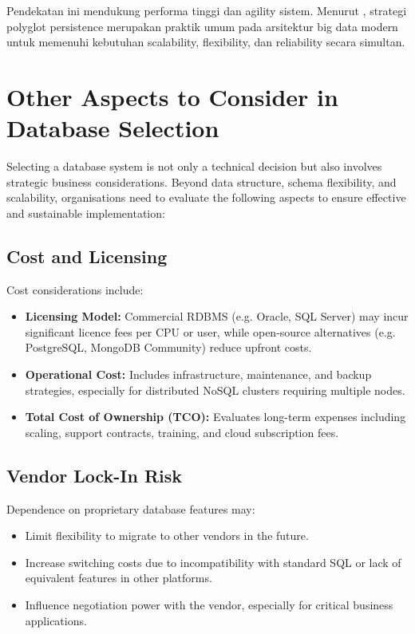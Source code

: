 Pendekatan ini mendukung performa tinggi dan agility sistem. Menurut \cite{gandomi2015}, strategi polyglot persistence merupakan praktik umum pada arsitektur big data modern untuk memenuhi kebutuhan scalability, flexibility, dan reliability secara simultan.

\section{Other Aspects to Consider in Database Selection}

Selecting a database system is not only a technical decision but also involves strategic business considerations. Beyond data structure, schema flexibility, and scalability, organisations need to evaluate the following aspects to ensure effective and sustainable implementation:

\subsection{Cost and Licensing}

Cost considerations include:
\begin{itemize}
	\item \textbf{Licensing Model:} Commercial RDBMS (e.g. Oracle, SQL Server) may incur significant licence fees per CPU or user, while open-source alternatives (e.g. PostgreSQL, MongoDB Community) reduce upfront costs.
	\item \textbf{Operational Cost:} Includes infrastructure, maintenance, and backup strategies, especially for distributed NoSQL clusters requiring multiple nodes.
	\item \textbf{Total Cost of Ownership (TCO):} Evaluates long-term expenses including scaling, support contracts, training, and cloud subscription fees.
\end{itemize}

\subsection{Vendor Lock-In Risk}

Dependence on proprietary database features may:
\begin{itemize}
	\item Limit flexibility to migrate to other vendors in the future.
	\item Increase switching costs due to incompatibility with standard SQL or lack of equivalent features in other platforms.
	\item Influence negotiation power with the vendor, especially for critical business applications.
\end{itemize}

